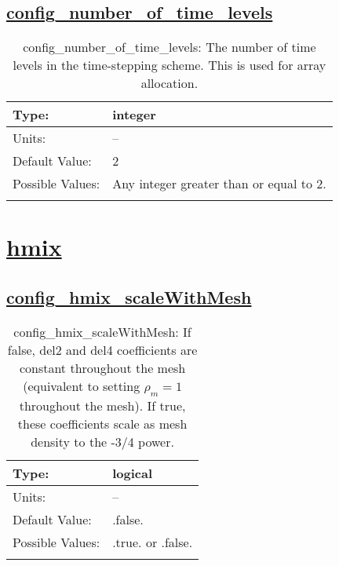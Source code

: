 \subsection[config\_number\_of\_time\_levels]{\hyperref[sec:nm_tab_time_integration]{config\_number\_of\_time\_levels}}
\label{subsec:nm_sec_config_number_of_time_levels}
\begin{center}
\begin{longtable}{| p{2.0in} || p{4.0in} |}
    \hline
    Type: & integer \\
    \hline
    Units: & -- \\
    \hline
    Default Value: & 2 \\
    \hline
    Possible Values: & Any integer greater than or equal to 2. \\
    \hline
    \caption{config\_number\_of\_time\_levels: The number of time levels in the time-stepping scheme. This is used for array allocation.}
\end{longtable}
\end{center}
\section[hmix]{\hyperref[sec:nm_tab_hmix]{hmix}}
\label{sec:nm_sec_hmix}
\subsection[config\_hmix\_scaleWithMesh]{\hyperref[sec:nm_tab_hmix]{config\_hmix\_scaleWithMesh}}
\label{subsec:nm_sec_config_hmix_scaleWithMesh}
\begin{center}
\begin{longtable}{| p{2.0in} || p{4.0in} |}
    \hline
    Type: & logical \\
    \hline
    Units: & -- \\
    \hline
    Default Value: & .false. \\
    \hline
    Possible Values: & .true. or .false. \\
    \hline
    \caption{config\_hmix\_scaleWithMesh: If false, del2 and del4 coefficients are constant throughout the mesh (equivalent to setting $\rho_m=1$ throughout the mesh).  If true, these coefficients scale as mesh density to the -3/4 power.}
\end{longtable}
\end{center}
